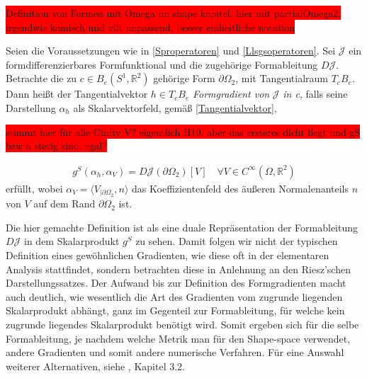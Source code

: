 \colorbox{red}{Definition von Formen mit Omega im shape kapitel, hier mit partialOmega2, irgendwie komisch und vllt unpassend, besser einheitliche notation}

\begin{defi}[Formgradient]\label{Formgradientdefi}
Seien die Voraussetzungen wie in \ref{Sproperatoren} und \ref{Llsgsoperatoren}.
Sei $\mathcal{J}$ ein formdifferenzierbares Formfunktional und die zugehörige Formableitung $D\mathcal{J}$. Betrachte die zu $c\in B_e(S^1,\mathbb{R}^2)$ gehörige Form $\partial\Omega_2$, mit Tangentialraum $T_cB_e$. Dann heißt der Tangentialvektor $h\in T_cB_e$ \textit{Formgradient von} $\mathcal{J}$ \textit{in c}, falls seine Darstellung $\alpha_h$ als Skalarvektorfeld, gemäß \ref{Tangentialvektor},

\colorbox{red}{stimmt hier für alle Cinfty V? eigentlich H10, aber das ersteres dicht liegt und gS bzw a stetig sind, egal?}

\begin{align}\label{Gradientengleichung}
	g^S(\alpha_h, \alpha_V) = D\mathcal{J}(\partial \Omega_2)[V] \quad \forall V\in C^\infty(\Omega,\mathbb{R}^2)
\end{align}
erfüllt, wobei $\alpha_V = \langle V_{\vert \partial\Omega_2}, n\rangle$ das Koeffizientenfeld des äußeren Normalenanteils $n$ von $V$ auf dem Rand $\partial \Omega_2$ ist.

\end{defi}

Die hier gemachte Definition ist als eine duale Repräsentation der Formableitung $D\mathcal{J}$ in dem Skalarprodukt $g^S$ zu sehen. Damit folgen wir nicht der typischen Definition eines gewöhnlichen Gradienten, wie diese oft in der elementaren Analysis stattfindet, sondern betrachten diese in Anlehnung an den  Riesz'schen Darstellungssatzes. Der Aufwand bis zur Definition des Formgradienten macht auch deutlich, wie wesentlich die Art des Gradienten vom zugrunde liegenden Skalarprodukt abhängt, ganz im Gegenteil zur Formableitung, für welche kein zugrunde liegendes Skalarprodukt benötigt wird. Somit ergeben sich für die selbe Formableitung, je nachdem welche Metrik man für den Shape-space verwendet, andere Gradienten und somit andere numerische Verfahren. Für eine Auswahl weiterer Alternativen, siehe \cite{shape_space}, Kapitel 3.2.

